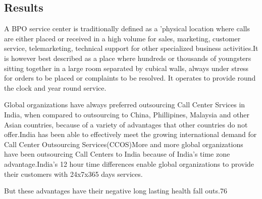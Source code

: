 \subsection{Results}

A BPO service center is traditionally defined as a 'physical location where calls are either placed or received in a high volume for sales, marketing, customer service, telemarketing, technical support for other specialized business activities.It is however best described as a place where hundreds or thousands of youngsters sitting together in a large room separated by cubical walls, always under stress for orders to be placed or complaints to be resolved. It operates to provide round the clock and year round service.

Global organizations have always preferred outsourcing Call Center Srvices in India, when compared to outsourcing to China, Phillipines, Malaysia and other Asian countries, because of a variety of advantages that other countries do not offer.India has been able to effectively meet the growing international demand for Call Center Outsourcing Services(CCOS)More and more global organizations have been outsourcing Call Centers to India because of India's time zone advantage.India's 12 hour time differences enable global organizations to provide their customers with 24x7x365 days services.

But these advantages have their negative long lasting health fall outs.76%

